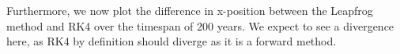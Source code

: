 

Furthermore, we now plot the difference in x-position between the Leapfrog method and RK4 over the timespan of 200 years. We expect to see a divergence here, as RK4 by definition should diverge as it is a forward method. 

















